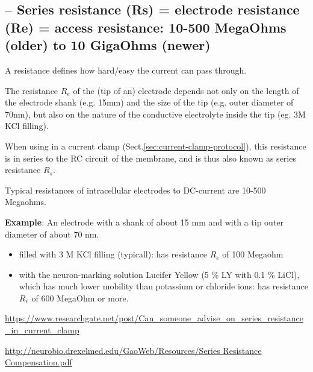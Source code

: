 \subsection{-- Series resistance (Rs) = electrode resistance (Re) = access
resistance: 10-500 MegaOhms (older) to 10 GigaOhms (newer)}
\label{sec:series-resistance}
\label{sec:electrode-resistance}
\label{sec:access-resistance}
\label{sec:microelectrode-filling-solution}
%

A resistance defines how hard/easy the current can pass through.

The resistance $R_e$ of the (tip of an) electrode depends not only on the length
of the electrode shank (e.g. 15mm) and the size of the tip (e.g. outer diameter
of 70nm), but also on the nature of the conductive electrolyte inside the tip
(eg. 3M KCl filling). 

When using in a current clamp (Sect.\ref{sec:current-clamp-protocol}), this
resistance is in series to the RC circuit of the membrane, and is thus also
known as series resistance $R_s$.

Typical resistances of intracellular electrodes to DC-current are 10-500
Megaohms.

{\bf Example}: An electrode with a shank of about 15 mm and with a tip outer
diameter of about 70 nm.
\begin{itemize}
  \item  filled with 3 M KCl filling (typicall): has resistance $R_e$ of 100
  Megaohm 
  
  \item with the neuron-marking solution Lucifer Yellow (5 \% LY with 0.1 \%
LiCl), which has much lower mobility than potassium or chloride ions: has
resistance $R_e$ of 600 MegaOhm or more.
\end{itemize}


\url{https://www.researchgate.net/post/Can_someone_advise_on_series_resistance_in_current_clamp}

\url{http://neurobio.drexelmed.edu/GaoWeb/Resources/Series Resistance Compensation.pdf}

